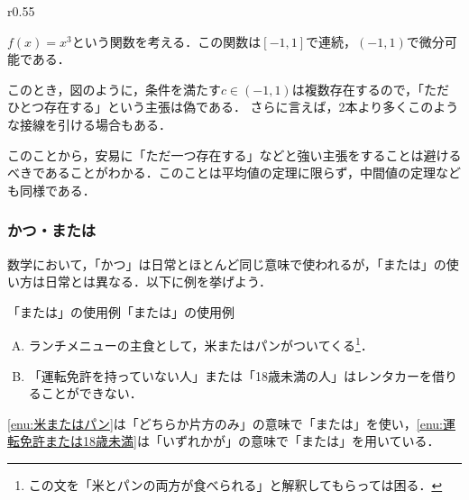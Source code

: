 \documentclass[a4paper,11pt]{ltjsarticle}
\begin{document}
\begin{wrapfigure}[11]{r}{0.55\textwidth}
	\centering
{}
\end{wrapfigure}
$f(x)=x^3$という関数を考える．この関数は$[-1,1]$で連続，$(-1,1)$で微分可能である．

このとき，図のように，条件を満たす$c \in (-1,1)$は複数存在するので，「ただひとつ存在する」という主張は偽である．
さらに言えば，2本より多くこのような接線を引ける場合もある．

このことから，安易に「ただ一つ存在する」などと強い主張をすることは避けるべきであることがわかる．このことは平均値の定理に限らず，中間値の定理なども同様である．


\subsubsection{かつ・または}



数学において，「かつ」は日常とほとんど同じ意味で使われるが，「または」の使い方は日常とは異なる．以下に例を挙げよう．

\begin{example}{「または」の使用例}{「または」の使用例}
    \begin{enumerate}[(A)]
	\item ランチメニューの主食として，米またはパンがついてくる\footnote{この文を「米とパンの両方が食べられる」と解釈してもらっては困る．}．\label{enu:米またはパン}
	\item 「運転免許を持っていない人」または「18歳未満の人」はレンタカーを借りることができない． \label{enu:運転免許または18歳未満}
	\end{enumerate}
\ref{enu:米またはパン}は「どちらか片方のみ」の意味で「または」を使い，\ref{enu:運転免許または18歳未満}は「いずれかが」の意味で「または」を用いている．
\end{example}
\end{document}
